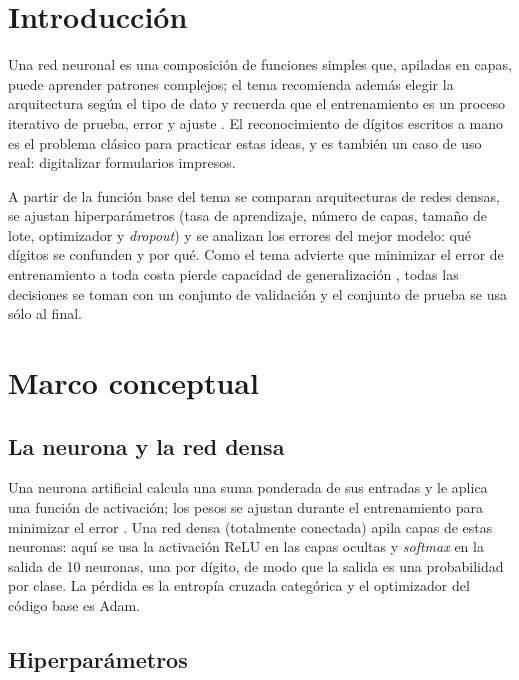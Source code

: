 \documentclass[11pt,letterpaper]{article}
\begin{document}
\portada
\indicegeneral

\section{Introducción}

Una red neuronal es una composición de funciones simples que, apiladas en capas, puede aprender patrones complejos; el tema recomienda además elegir la arquitectura según el tipo de dato y recuerda que el entrenamiento es un proceso iterativo de prueba, error y ajuste \parencite{iae_u4_t44}. El reconocimiento de dígitos escritos a mano es el problema clásico para practicar estas ideas, y es también un caso de uso real: digitalizar formularios impresos.

A partir de la función base del tema se comparan arquitecturas de redes densas, se ajustan hiperparámetros (tasa de aprendizaje, número de capas, tamaño de lote, optimizador y \textit{dropout}) y se analizan los errores del mejor modelo: qué dígitos se confunden y por qué. Como el tema advierte que minimizar el error de entrenamiento a toda costa pierde capacidad de generalización \parencite{iae_u4_t44}, todas las decisiones se toman con un conjunto de validación y el conjunto de prueba se usa sólo al final.

\section{Marco conceptual}

\subsection{La neurona y la red densa}

Una neurona artificial calcula una suma ponderada de sus entradas y le aplica una función de activación; los pesos se ajustan durante el entrenamiento para minimizar el error \parencite{iae_u4_t44}. Una red densa (totalmente conectada) apila capas de estas neuronas: aquí se usa la activación ReLU en las capas ocultas y \textit{softmax} en la salida de 10 neuronas, una por dígito, de modo que la salida es una probabilidad por clase. La pérdida es la entropía cruzada categórica y el optimizador del código base es Adam.

\subsection{Hiperparámetros}
\end{document}
